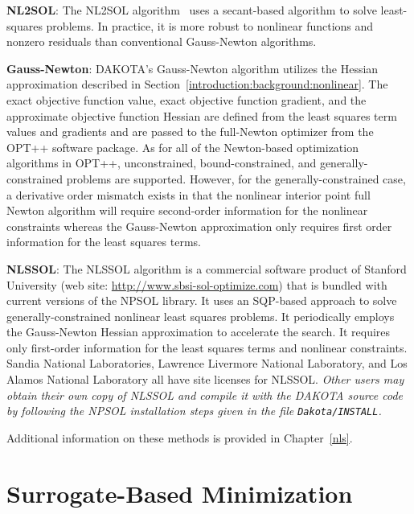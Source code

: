 \textbf{NL2SOL}: The NL2SOL algorithm~\cite{Den81} uses a secant-based
algorithm to solve least-squares problems. In practice, it is more
robust to nonlinear functions and nonzero residuals than conventional
Gauss-Newton algorithms.

\textbf{Gauss-Newton}: DAKOTA's Gauss-Newton algorithm utilizes the
Hessian approximation described in
Section~\ref{introduction:background:nonlinear}. The exact objective
function value, exact objective function gradient, and the approximate
objective function Hessian are defined from the least squares term
values and gradients and are passed to the full-Newton optimizer from
the OPT++ software package. As for all of the Newton-based
optimization algorithms in OPT++, unconstrained, bound-constrained,
and generally-constrained problems are supported. However, for the
generally-constrained case, a derivative order mismatch exists in that
the nonlinear interior point full Newton algorithm will require
second-order information for the nonlinear constraints whereas the
Gauss-Newton approximation only requires first order information for
the least squares terms.

\textbf{NLSSOL}: The NLSSOL algorithm is a commercial software product
of Stanford University (web site: \url{http://www.sbsi-sol-optimize.com})
that is bundled with current versions of the NPSOL library. It uses an
SQP-based approach to solve generally-constrained nonlinear least
squares problems. It periodically employs the Gauss-Newton Hessian
approximation to accelerate the search. It requires only first-order
information for the least squares terms and nonlinear constraints.
Sandia National Laboratories, Lawrence Livermore National Laboratory,
and Los Alamos National Laboratory all have site licenses for NLSSOL.
\emph{Other users may obtain their own copy of NLSSOL and compile it with
the DAKOTA source code by following the NPSOL installation steps given
in the file {\tt Dakota/INSTALL}.}

Additional information on these methods is provided in Chapter~\ref{nls}.

\section{Surrogate-Based Minimization}\label{capabilities:sbm}

